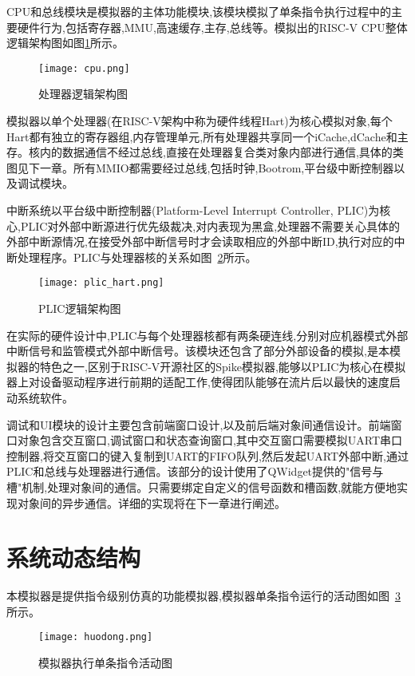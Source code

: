 CPU和总线模块是模拟器的主体功能模块,该模块模拟了单条指令执行过程中的主要硬件行为,包括寄存器,MMU,高速缓存,主存,总线等。模拟出的RISC-V CPU整体逻辑架构图如图\ref{fig:cpu}所示。
\begin{figure}[H]
  \centering
  \texttt{[image: cpu.png]}
  \caption{处理器逻辑架构图}
  \label{fig:cpu}
\end{figure}
模拟器以单个处理器(在RISC-V架构中称为硬件线程Hart)为核心模拟对象,每个Hart都有独立的寄存器组,内存管理单元,所有处理器共享同一个iCache,dCache和主存。核内的数据通信不经过总线,直接在处理器复合类对象内部进行通信,具体的类图见下一章。所有MMIO都需要经过总线,包括时钟,Bootrom,平台级中断控制器以及调试模块。


中断系统以平台级中断控制器(Platform-Level Interrupt Controller, PLIC)为核心,PLIC对外部中断源进行优先级裁决,对内表现为黑盒,处理器不需要关心具体的外部中断源情况,在接受外部中断信号时才会读取相应的外部中断ID,执行对应的中断处理程序。PLIC与处理器核的关系如图~\ref{fig:plic-to-hart}所示。
\begin{figure}[H]
  \centering
  \texttt{[image: plic\_hart.png]}
  \caption{PLIC逻辑架构图}
  \label{fig:plic-to-hart}
\end{figure}
在实际的硬件设计中,PLIC与每个处理器核都有两条硬连线,分别对应机器模式外部中断信号和监管模式外部中断信号。该模块还包含了部分外部设备的模拟,是本模拟器的特色之一,区别于RISC-V开源社区的Spike模拟器,能够以PLIC为核心在模拟器上对设备驱动程序进行前期的适配工作,使得团队能够在流片后以最快的速度启动系统软件。


调试和UI模块的设计主要包含前端窗口设计,以及前后端对象间通信设计。前端窗口对象包含交互窗口,调试窗口和状态查询窗口,其中交互窗口需要模拟UART串口控制器,将交互窗口的键入复制到UART的FIFO队列,然后发起UART外部中断,通过PLIC和总线与处理器进行通信。该部分的设计使用了QWidget提供的"信号与槽"机制,处理对象间的通信。只需要绑定自定义的信号函数和槽函数,就能方便地实现对象间的异步通信。详细的实现将在下一章进行阐述。

\section{系统动态结构}
本模拟器是提供指令级别仿真的功能模拟器,模拟器单条指令运行的活动图如图~\ref{fig:sim-seq1}所示。
\begin{figure}[H]
  \centering
  \texttt{[image: huodong.png]}
  \caption{模拟器执行单条指令活动图}
  \label{fig:sim-seq1}
\end{figure}


